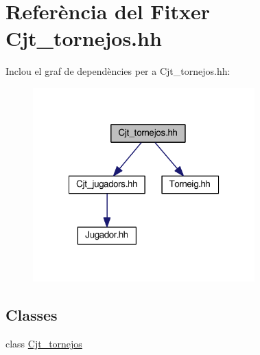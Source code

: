 \hypertarget{_cjt__tornejos_8hh}{}\section{Referència del Fitxer Cjt\+\_\+tornejos.\+hh}
\label{_cjt__tornejos_8hh}
Inclou el graf de dependències per a Cjt\+\_\+tornejos.\+hh\+:\nopagebreak
\begin{figure}[H]
\begin{center}
\leavevmode
\includegraphics[width=242pt]{_cjt__tornejos_8hh__incl}
\end{center}
\end{figure}
\subsection*{Classes}
\begin{DoxyCompactItemize}
\item 
class \mbox{\hyperlink{class_cjt__tornejos}{Cjt\+\_\+tornejos}}
\end{DoxyCompactItemize}
